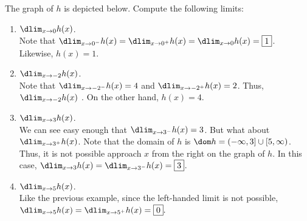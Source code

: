 \documentclass{book}
\begin{document}
\begin{Exam} The graph of $h$ is depicted below. Compute the following limits:
\begin{center}
\end{center}
\begin{enumerate}
\item $\dlim_{x\to 0} h(x)$.\\

Note that $\dlim_{x\to 0^-} h(x) = \dlim_{x\to 0^+} h(x) = \dlim_{x\to 0} h(x) = \fbox{$1$}$. Likewise, $h(x) = 1$.\\

\item $\dlim_{x\to -2} h(x)$.\\

Note that $\dlim_{x\to -2^-} h(x) = 4$ and $\dlim_{x\to -2^+} h(x) = 2$. Thus, $\dlim_{x\to -2} h(x)$ . On the other hand, $h(x) = 4$.\\
\end{enumerate}
\begin{enumerate}
\setcounter{enumi}{2}
\item $\dlim_{x\to 3} h(x)$.\\

We can see easy enough that $\dlim_{x\to 3^-} h(x) = 3$. But what about $\dlim_{x\to 3^+} h(x)$. Note that the domain of $h$ is $\dom h = (-\infty, 3] \cup [5, \infty)$. Thus, it is not possible approach $x$ from the right on the graph of $h$. In this case, $\dlim_{x\to 3} h(x) = \dlim_{x\to 3^-} h(x) = \fbox{$3$}$.\\

\item $\dlim_{x\to 5} h(x)$.\\

Like the previous example, since the left-handed limit is not possible, $\dlim_{x\to 5} h(x) = \dlim_{x\to 5^+} h(x) = \fbox{$0$}. $
\end{enumerate}
\end{Exam}\vs
\end{document}
